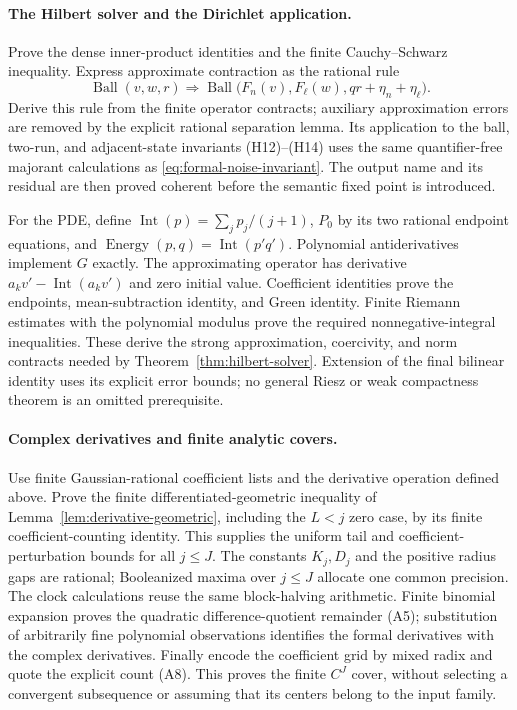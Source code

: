 \paragraph{The Hilbert solver and the Dirichlet application.}
Prove the dense inner-product identities and the finite Cauchy--Schwarz
inequality. Express approximate contraction as the rational rule
\[
 \operatorname{Ball}(v,w,r)\Longrightarrow
 \operatorname{Ball}\bigl(F_n(v),F_\ell(w),
                    qr+\eta_n+\eta_\ell\bigr).
 \tag{F4}\label{eq:formal-local-contraction}
\]
Derive this rule from the finite operator contracts; auxiliary approximation
errors are removed by the explicit rational separation lemma. Its
application to the ball, two-run, and adjacent-state invariants (H12)--(H14)
uses the same quantifier-free majorant calculations as
\eqref{eq:formal-noise-invariant}. The output name and its residual are
then proved coherent before the semantic fixed point is introduced.

For the PDE, define \(\operatorname{Int}(p)=\sum_jp_j/(j+1)\),
\(P_0\) by its two rational endpoint equations, and
\(\operatorname{Energy}(p,q)=\operatorname{Int}(p'q')\).
Polynomial antiderivatives implement \(G\) exactly. The approximating
operator has derivative
\(a_kv'-\operatorname{Int}(a_kv')\) and zero initial value.
Coefficient identities prove the endpoints, mean-subtraction identity,
and Green identity. Finite Riemann estimates with the polynomial modulus
prove the required nonnegative-integral inequalities. These derive the
strong approximation, coercivity, and norm contracts needed by
Theorem~\ref{thm:hilbert-solver}. Extension of the final bilinear identity
uses its explicit error bounds; no general Riesz or weak compactness
theorem is an omitted prerequisite.

\paragraph{Complex derivatives and finite analytic covers.}
Use finite Gaussian-rational coefficient lists and the derivative operation
defined above. Prove the finite differentiated-geometric inequality
of Lemma~\ref{lem:derivative-geometric}, including the \(L<j\) zero case,
by its finite coefficient-counting identity. This supplies the uniform
tail and coefficient-perturbation bounds for all \(j\leq J\).
The constants \(K_j,D_j\) and the positive radius gaps are rational;
Booleanized maxima over \(j\leq J\) allocate one common precision.
The clock calculations reuse the same block-halving arithmetic.
Finite binomial expansion proves the quadratic difference-quotient remainder
(A5); substitution of arbitrarily fine polynomial observations identifies
the formal derivatives with the complex derivatives. Finally encode the
coefficient grid by mixed radix and quote the explicit count (A8).
This proves the finite \(C^J\) cover, without selecting a convergent
subsequence or assuming that its centers belong to the input family.

